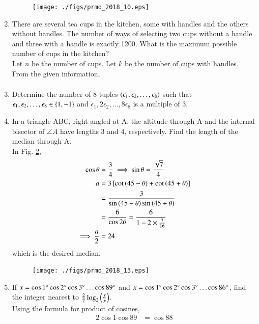 \documentclass[journal,12pt,twocolumn]{IEEEtran}
\begin{document}
\begin{enumerate}[label=\arabic*]
\begin{figure}[!ht]
\centering
\texttt{[image: ./figs/prmo\_2018\_10.eps]}
\caption{}
\label{fig:prmo_2018_10}
\end{figure}
\item There are several tea cups in the kitchen, some with handles and the others without handles. The number of ways of selecting two cups without a handle and three with a handle is exactly 1200. What is the maximum possible number of cups in the kitchen?
\\
\solution Let $n$ be the number of cups.  Let $k$ be the number of cups with handles. From the given information,
\begin{align}
\end{align}

\item  Determine the number of 8-tuples $\left(\epsilon_1, \epsilon_2, \dots , \epsilon_8\right)$ such that $\epsilon_1, \epsilon_2, \dots , \epsilon_8 \in \left\{1,-1\right\}$
and $\epsilon_1, 2\epsilon_2, \dots , 8\epsilon_8$
is a multiple of 3. 
\item In a triangle ABC, right-angled at A, the altitude through A and the internal bisector of $\angle A$ have lengths 3 and 4, respectively. Find the length of the median through A. 
\\
\solution In Fig. \ref{fig:prmo_2018_13},
\begin{align}
\cos \theta &= \frac{3}{4} \implies \sin\theta = \frac{\sqrt{7}}{4}
\\
a &= 3 {}\left[\cot \left(45-\theta\right)+\cot \left(45+\theta\right)\right]
\\
&=  \frac{3}{\sin \left(45-\theta\right)\sin \left(45+\theta\right)}
\\
&=  \frac{6}{\cos 2\theta} = \frac{6}{1-2\times  \frac{7}{16}}  
\\
\implies \frac{a}{2}&= 24
\end{align}
%
which is the desired median.
\begin{figure}[!ht]
\centering
\texttt{[image: ./figs/prmo\_2018\_13.eps]}
\caption{}
\label{fig:prmo_2018_13}
\end{figure}
\item If $x = \cos 1\degree \cos 2\degree \cos 3\degree \dots \cos 89\degree$
and $x = \cos 1\degree \cos 2\degree \cos 3\degree \dots \cos 86\degree$, find the integer nearest to $\frac{2}{7}\log_2\left(\frac{y}{x}\right)$.
\\
\solution Using the formula for product of cosines, 
%
\begin{align}
2\cos 1 \cos 89 &= \cos 88

\end{align}
\end{enumerate}
\end{document}
